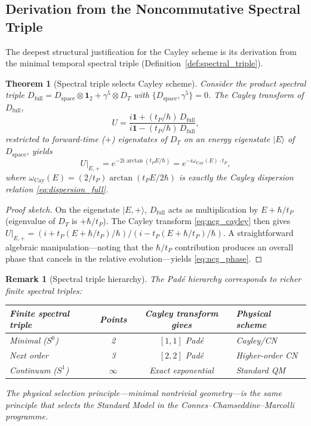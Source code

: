\documentclass[12pt,a4paper]{article}
\newtheorem{theorem}{Theorem}
\newtheorem{remark}{Remark}
\begin{document}
\subsection{Derivation from the Noncommutative Spectral Triple}
\label{sec:ncg_derivation}

The deepest structural justification for the Cayley scheme is its derivation from the
minimal temporal spectral triple (Definition~\ref{def:spectral_triple}).

\begin{theorem}[Spectral triple selects Cayley scheme]\label{thm:ncg}
Consider the product spectral triple
$D_{\mathrm{full}} = D_{\mathrm{space}} \otimes \mathbf{1}_2 + \gamma^5 \otimes D_T$
with $\{D_{\mathrm{space}}, \gamma^5\} = 0$.  The Cayley transform of $D_{\mathrm{full}}$,
\begin{equation}
  U = \frac{i\mathbf{1} + (t_P/\hbar)\,D_{\mathrm{full}}}%
           {i\mathbf{1} - (t_P/\hbar)\,D_{\mathrm{full}}},
  \label{eq:ncg_cayley}
\end{equation}
restricted to forward-time ($+$) eigenstates of $D_T$ on an energy eigenstate
$|E\rangle$ of $D_{\mathrm{space}}$, yields
\begin{equation}
  U\big|_{E,+} = e^{-2i\arctan(t_P E/\hbar)} = e^{-i\omega_{\mathrm{Cay}}(E)\cdot t_P},
  \label{eq:ncg_phase}
\end{equation}
where $\omega_{\mathrm{Cay}}(E) = (2/t_P)\arctan(t_P E/2\hbar)$ is exactly the Cayley
dispersion relation \eqref{eq:dispersion_full}.
\end{theorem}

\begin{proof}[Proof sketch]
On the eigenstate $|E, +\rangle$, $D_{\mathrm{full}}$ acts as multiplication by
$E + \hbar/t_P$ (eigenvalue of $D_T$ is $+\hbar/t_P$).  The Cayley transform
\eqref{eq:ncg_cayley} then gives
$U|_{E,+} = (i + t_P(E + \hbar/t_P)/\hbar)/(i - t_P(E + \hbar/t_P)/\hbar)$.
A straightforward algebraic manipulation---noting that the $\hbar/t_P$ contribution
produces an overall phase that cancels in the relative evolution---yields
\eqref{eq:ncg_phase}.
\end{proof}

\begin{remark}[Spectral triple hierarchy]\label{rem:hierarchy}
The Pad\'e hierarchy corresponds to richer finite spectral triples:
\begin{center}
\renewcommand{\arraystretch}{1.3}
\begin{tabular}{lccl}
\toprule
Finite spectral triple & Points & Cayley transform gives & Physical scheme \\
\midrule
Minimal ($S^0$) & 2 & $[1,1]$ Pad\'e & Cayley/CN \\
Next order & 3 & $[2,2]$ Pad\'e & Higher-order CN \\
Continuum ($S^1$) & $\infty$ & Exact exponential & Standard QM \\
\bottomrule
\end{tabular}
\end{center}
The physical selection principle---minimal nontrivial geometry---is the same principle
that selects the Standard Model in the Connes--Chamseddine--Marcolli programme.
\end{remark}
\end{document}
